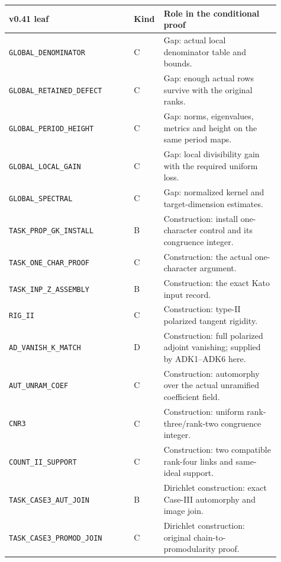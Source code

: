 \documentclass[11pt,a4paper]{article}
\numberwithin{equation}{section}
\theoremstyle{remark}\newtheorem{remark}[theorem]{Remark}
\begin{document}
\begin{longtable}{p{0.44\linewidth}p{0.06\linewidth}p{0.41\linewidth}}
\textbf{v0.41 leaf} & \textbf{Kind} & \textbf{Role in the conditional proof}\\\hline
\endhead
\texttt{GLOBAL\_\allowbreak DENOMINATOR} & C & Gap: actual local denominator table and bounds.\\
\texttt{GLOBAL\_\allowbreak RETAINED\_\allowbreak DEFECT} & C & Gap: enough actual rows survive with the original ranks.\\
\texttt{GLOBAL\_\allowbreak PERIOD\_\allowbreak HEIGHT} & C & Gap: norms, eigenvalues, metrics and height on the same period maps.\\
\texttt{GLOBAL\_\allowbreak LOCAL\_\allowbreak GAIN} & C & Gap: local divisibility gain with the required uniform loss.\\
\texttt{GLOBAL\_\allowbreak SPECTRAL} & C & Gap: normalized kernel and target-dimension estimates.\\
\texttt{TASK\_\allowbreak PROP\_\allowbreak GK\_\allowbreak INSTALL} & B & Construction: install one-character control and its congruence integer.\\
\texttt{TASK\_\allowbreak ONE\_\allowbreak CHAR\_\allowbreak PROOF} & C & Construction: the actual one-character argument.\\
\texttt{TASK\_\allowbreak INP\_\allowbreak Z\_\allowbreak ASSEMBLY} & B & Construction: the exact Kato input record.\\
\texttt{RIG\_\allowbreak II} & C & Construction: type-II polarized tangent rigidity.\\
\texttt{AD\_\allowbreak VANISH\_\allowbreak K\_\allowbreak MATCH} & D & Construction: full polarized adjoint vanishing; supplied by ADK1--ADK6 here.\\
\texttt{AUT\_\allowbreak UNRAM\_\allowbreak COEF} & C & Construction: automorphy over the actual unramified coefficient field.\\
\texttt{CNR3} & C & Construction: uniform rank-three/rank-two congruence integer.\\
\texttt{COUNT\_\allowbreak II\_\allowbreak SUPPORT} & C & Construction: two compatible rank-four links and same-ideal support.\\
\texttt{TASK\_\allowbreak CASE3\_\allowbreak AUT\_\allowbreak JOIN} & B & Dirichlet construction: exact Case-III automorphy and image join.\\
\texttt{TASK\_\allowbreak CASE3\_\allowbreak PROMOD\_\allowbreak JOIN} & C & Dirichlet construction: original chain-to-promodularity proof.\\

\end{longtable}
\end{document}

